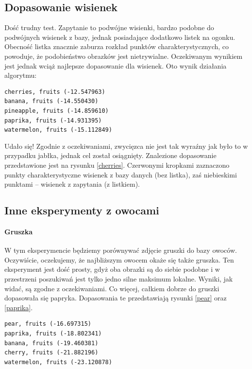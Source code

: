 \documentclass[a4paper,12pt,leqno]{article}
\begin{document}
\subsection{Dopasowanie wisienek}
Dość trudny test. Zapytanie to podwójne wisienki, bardzo podobne do podwójnych wisienek z bazy, jednak posiadające dodatkowo listek na ogonku. 
Obecność listka znacznie zaburza rozkład punktów charakterystycznych, co powoduje, że podobieństwo obrazków jest nietrywialne. Oczekiwanym
wynikiem jest jednak wciąż najlepsze dopasowanie dla wisienek. Oto wynik działania algorytmu:
\begin{verbatim}
cherries, fruits (-12.547963)
banana, fruits (-14.550430)
pineapple, fruits (-14.859610)
paprika, fruits (-14.931395)
watermelon, fruits (-15.112849)
\end{verbatim}
Udało się! Zgodnie z oczekiwaniami, zwycięzca nie jest tak wyraźny jak było to w przypadku jabłka, jednak cel został osiągnięty. Znalezione dopasowanie
przedstawione jest na rysunku \ref{cherries}. Czerwonymi kropkami zaznaczono punkty charakterystyczne wisienek z bazy danych (bez listka), zaś 
niebieskimi punktami -- wisienek z zapytania (z listkiem).

\subsection{Inne eksperymenty z owocami}

\paragraph{Gruszka}
W tym eksperymencie będziemy porównywać zdjęcie gruszki do bazy owoców. Oczywiście, oczekujemy, że najbliższym owocem okaże się także gruszka.
Ten eksperyment jest dość prosty, gdyż oba obrazki są do siebie podobne i w przestrzeni poszukiwań jest tylko jedno silne maksimum lokalne. 
Wyniki, jak widać, są zgodne z oczekiwaniami. Co więcej, całkiem dobrze do gruszki dopasowała się papryka. Dopasowania te przedstawiają rysunki \ref{pear} oraz \ref{paprika}.
\begin{verbatim}
pear, fruits (-16.697315)
paprika, fruits (-18.802341)
banana, fruits (-19.460381)
cherry, fruits (-21.882196)
watermelon, fruits (-23.120878)
\end{verbatim}
\end{document}

